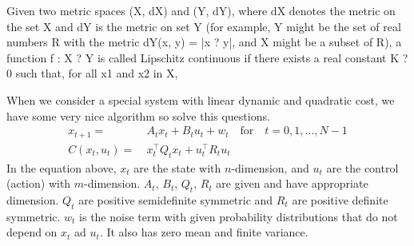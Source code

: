 \documentclass[9pt]{article}
\begin{document}
Given two metric spaces (X, dX) and (Y, dY), where dX denotes the metric on the set X and dY is the metric on set Y (for example, Y might be the set of real numbers R with the metric dY(x, y) = |x ? y|, and X might be a subset of R), a function f : X ? Y is called Lipschitz continuous if there exists a real constant K ? 0 such that, for all x1 and x2 in X,

\citep{Eriksson2013Applied}

 When we consider a special system with linear dynamic and quadratic cost, we have some very nice algorithm so solve this questions.
\[
\begin{split}
	x_{t+1} = &\ A_{t}x_{t} + B_tu_t + w_t    \quad \text{for} \quad t = 0,1,\ldots,N-1\\
	C(x_t,u_t) = &\ x_t^{\top}Q_tx_t + u_t^{\top}R_tu_t
\end{split}
\]
In the equation above, $x_t$ are the state with $n$-dimension, and $u_t$ are the control (action) with $m$-dimension. $A_t$, $B_t$, $Q_t$, $R_t$ are given and have appropriate dimension. $Q_t$ are positive semidefinite symmetric and $R_t$ are positive definite symmetric. $w_t$ is the noise term with given probability distributions that do not depend on $x_t$ ad $u_t$. It also has zero mean and finite variance.
\end{document}

